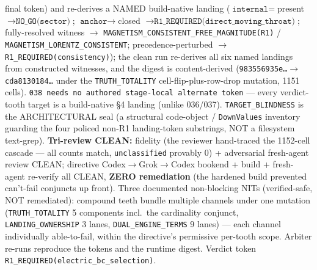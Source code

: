 final token) and re-derives a NAMED build-native landing
(\(\texttt{internal}=\)present \(\to\texttt{NO\_GO(sector)}\);
\(\texttt{anchor}\to\)closed \(\to\texttt{R1\_REQUIRED(direct\_moving\_throat)}\);
fully-resolved witness \(\to\)
\texttt{MAGNETISM\_CONSISTENT\_FREE\_MAGNITUDE(R1)} /
\texttt{MAGNETISM\_LORENTZ\_CONSISTENT}; precedence-perturbed \(\to\)
\texttt{R1\_REQUIRED(consistency)}); the clean run re-derives all six named
landings from constructed witnesses, and the digest is content-derived
(\texttt{983556935e\ldots}\(\to\)\texttt{cda8130184\ldots} under the
\texttt{TRUTH\_TOTALITY} cell-flip-plus-row-drop mutation, 1151 cells).
\texttt{038 needs no authored stage-local alternate token} --- every
verdict-tooth target is a build-native \S4 landing (unlike 036/037).
\texttt{TARGET\_BLINDNESS} is the ARCHITECTURAL seal (a structural code-object /
\texttt{DownValues} inventory guarding the four policed non-R1 landing-token
substrings, NOT a filesystem text-grep). \textbf{Tri-review CLEAN:} fidelity
(the reviewer hand-traced the 1152-cell cascade --- all counts match,
\texttt{unclassified} provably 0) + adversarial fresh-agent review CLEAN;
directive Codex\(\to\)Grok\(\to\)Codex bookend + build + fresh-agent re-verify all
CLEAN, \textbf{ZERO remediation} (the hardened build prevented can't-fail
conjuncts up front). Three documented non-blocking NITs (verified-safe, NOT
remediated): compound teeth bundle multiple channels under one mutation
(\texttt{TRUTH\_TOTALITY} 5 components incl.\ the cardinality conjunct,
\texttt{LANDING\_OWNERSHIP} 3 lanes, \texttt{DUAL\_ENGINE\_TERMS} 9 lanes) --- each
channel individually able-to-fail, within the directive's permissive per-tooth
scope. Arbiter re-runs reproduce the tokens and the runtime digest. Verdict
token \texttt{R1\_REQUIRED(electric\_bc\_selection)}.
